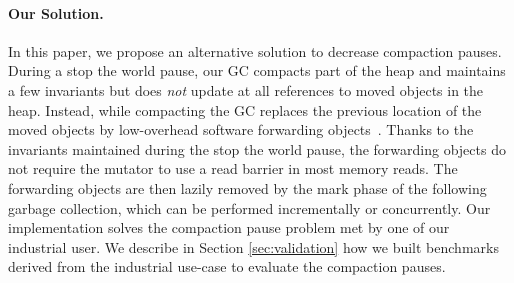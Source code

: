 \documentclass[sigplan,10pt,screen]{acmart}\settopmatter{printfolios=true,printccs=true,printacmref=true}
\begin{document}



\paragraph{Our Solution.} 
In this paper, we propose an alternative solution to decrease compaction pauses. During a stop the world pause, our GC compacts part of the heap and maintains a few invariants but does \emph{not} update at all references to moved objects in the heap. Instead, while compacting the GC replaces the previous location of the moved objects by low-overhead software forwarding objects~\cite{Forwarders}. Thanks to the invariants maintained during the stop the world pause, the forwarding objects do not require the mutator to use a read barrier in most memory reads. The forwarding objects are then lazily removed by the mark phase of the following garbage collection, which can be performed incrementally or concurrently. Our implementation solves the compaction pause problem met by one of our industrial user. We describe in Section \ref{sec:validation} how we built benchmarks derived from the industrial use-case to evaluate the compaction pauses. %
\end{document}

